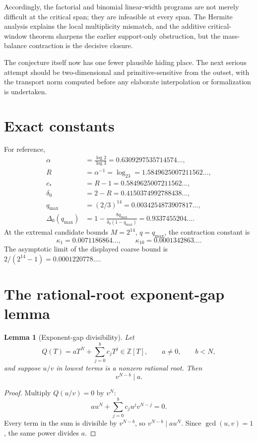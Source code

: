 \documentclass[11pt,oneside]{article}
\newtheorem{lemma}[theorem]{Lemma}
\theoremstyle{definition}
\theoremstyle{remark}
\newcommand{\Z}{\mathbb Z}
\newcommand{\cstar}{c_{\!*}}
\begin{document}
Accordingly, the factorial and binomial linear-width programs are not merely difficult at
the critical span; they are infeasible at every span.  The Hermite analysis explains the
local multiplicity mismatch, and the additive critical-window theorem sharpens the earlier
support-only obstruction, but the mass-balance contraction is the decisive closure.

The conjecture itself now has one fewer plausible hiding place.  The next serious attempt
should be two-dimensional and primitive-sensitive from the outset, with the transport norm
computed before any elaborate interpolation or formalization is undertaken.

\appendix

\section{Exact constants}
\label{app:constants}

For reference,
\begin{align*}
 \alpha&=\frac{\log2}{\log3}=0.6309297535714574\ldots,\\
 R&=\alpha^{-1}=\log_23=1.5849625007211562\ldots,\\
 \cstar&=R-1=0.5849625007211562\ldots,\\
 \delta_0&=2-R=0.4150374992788438\ldots,\\
 q_{\max}&=(2/3)^{14}=0.0034254873907817\ldots,\\
 \Delta_0(q_{\max})&=1-\frac{8q_{\max}}{\delta_0(1-q_{\max})}
 =0.9337455204\ldots.
\end{align*}
At the extremal candidate bounds $M=2^{14}$, $q=q_{\max}$, the contraction constant is
\[
 \kappa_1=0.0071186864\ldots,
 \qquad
 \kappa_{10}=0.0001342863\ldots.
\]
The asymptotic limit of the displayed coarse bound is
$2/(2^{14}-1)=0.0001220778\ldots$.

\section{The rational-root exponent-gap lemma}
\label{app:root-gap}

\begin{lemma}[Exponent-gap divisibility]
Let
\[
 Q(T)=aT^N+\sum_{j=0}^{b}c_jT^j\in\Z[T],
 \qquad a\ne0,
 \qquad b<N,
\]
and suppose $u/v$ in lowest terms is a nonzero rational root.  Then
\[
 v^{N-b}\mid a.
\]
\end{lemma}

\begin{proof}
Multiply $Q(u/v)=0$ by $v^N$:
\[
 au^N+\sum_{j=0}^bc_ju^jv^{N-j}=0.
\]
Every term in the sum is divisible by $v^{N-b}$, so $v^{N-b}\mid au^N$.  Since
$\gcd(u,v)=1$, the same power divides $a$.
\end{proof}
\end{document}
